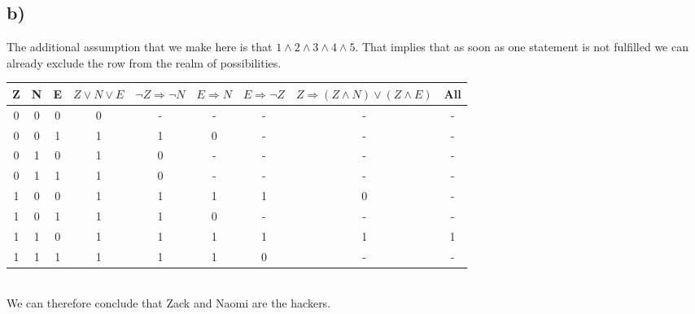 \documentclass[a4paper]{article}
\begin{document}
	\subsection*{b)}
	The additional assumption that we make here is that $1 \land 2 \land 3 \land 4  \land 5$. That implies that as soon as one statement is not fulfilled we can already exclude the row from the realm of possibilities.\\
	\begin{tabular}{c | c | c || c | c | c | c | c || c }
		Z & N & E & $Z \lor N  \lor E$ &  $\neg Z \Rightarrow \neg N$ & $E \Rightarrow N$ & $E \Rightarrow \neg Z$ & $Z  \Rightarrow (Z \land N) \lor (Z \land E)$ & All \\ \hline
		0 & 0 & 0 & 0 &  - & -  & - & - & -  \\
		0 & 0 & 1 & 1 & 1 & 0 & - & - & -  \\
		0 & 1 & 0 & 1 & 0 & - & - & - & -  \\
		0 & 1 & 1 & 1 & 0 & - & - & - & - \\
		1 & 0 & 0 & 1 & 1 & 1 & 1 & 0 & - \\
		1 & 0 & 1 & 1 & 1 & 0 & - & - & - \\
		1 & 1 & 0 & 1 & 1 & 1 & 1 & 1 & 1 \\
		1 & 1 & 1 & 1 & 1 & 1 & 0 & - & - \\
	\end{tabular}
	\\
	We can therefore conclude that Zack and Naomi are the hackers.
\end{document}
